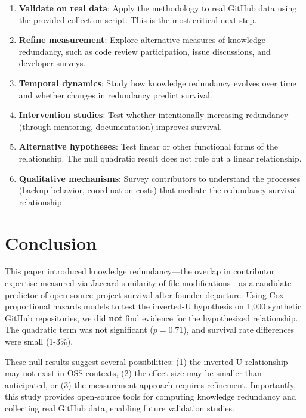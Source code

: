 \documentclass[11pt,letterpaper]{article}
\begin{document}
\begin{enumerate}
    \item \textbf{Validate on real data}: Apply the methodology to real GitHub data using the provided collection script. This is the most critical next step.
    
    \item \textbf{Refine measurement}: Explore alternative measures of knowledge redundancy, such as code review participation, issue discussions, and developer surveys.
    
    \item \textbf{Temporal dynamics}: Study how knowledge redundancy evolves over time and whether changes in redundancy predict survival.
    
    \item \textbf{Intervention studies}: Test whether intentionally increasing redundancy (through mentoring, documentation) improves survival.
    
    \item \textbf{Alternative hypotheses}: Test linear or other functional forms of the relationship. The null quadratic result does not rule out a linear relationship.
    
    \item \textbf{Qualitative mechanisms}: Survey contributors to understand the processes (backup behavior, coordination costs) that mediate the redundancy-survival relationship.
\end{enumerate}

\section{Conclusion}

This paper introduced knowledge redundancy---the overlap in contributor expertise measured via Jaccard similarity of file modifications---as a candidate predictor of open-source project survival after founder departure. Using Cox proportional hazards models to test the inverted-U hypothesis on 1,000 synthetic GitHub repositories, we did \textbf{not} find evidence for the hypothesized relationship. The quadratic term was not significant ($p = 0.71$), and survival rate differences were small (1-3\%).

These null results suggest several possibilities: (1) the inverted-U relationship may not exist in OSS contexts, (2) the effect size may be smaller than anticipated, or (3) the measurement approach requires refinement. Importantly, this study provides open-source tools for computing knowledge redundancy and collecting real GitHub data, enabling future validation studies.
\end{document}
